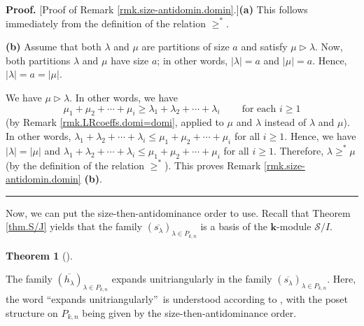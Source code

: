 \documentclass[numbers=enddot,12pt,final,onecolumn,notitlepage]{scrartcl}%
\theoremstyle{definition}
\newtheorem{theo}{Theorem}[section]
\newenvironment{theorem}[1][]
{\begin{theo}[#1]\begin{leftbar}}
{\end{leftbar}\end{theo}}
\newenvironment{proof}[1][Proof]{\noindent\textbf{#1.} }{\ \rule{0.5em}{0.5em}}
\begin{document}
\begin{proof}
[Proof of Remark \ref{rmk.size-antidomin.domin}.]\textbf{(a)} This follows
immediately from the definition of the relation $\geq^{\ast}$.

\textbf{(b)} Assume that both $\lambda$ and $\mu$ are partitions of size $a$
and satisfy $\mu\triangleright\lambda$. Now, both partitions $\lambda$ and
$\mu$ have size $a$; in other words, $\left\vert \lambda\right\vert =a$ and
$\left\vert \mu\right\vert =a$. Hence, $\left\vert \lambda\right\vert
=a=\left\vert \mu\right\vert $.

We have $\mu\triangleright\lambda$. In other words, we have
\[
\mu_{1}+\mu_{2}+\cdots+\mu_{i}\geq\lambda_{1}+\lambda_{2}+\cdots+\lambda
_{i}\ \ \ \ \ \ \ \ \ \ \text{for each }i\geq1
\]
(by Remark \ref{rmk.LRcoeffs.domi=domi}, applied to $\mu$ and $\lambda$
instead of $\lambda$ and $\mu$). In other words, $\lambda_{1}+\lambda
_{2}+\cdots+\lambda_{i}\leq\mu_{1}+\mu_{2}+\cdots+\mu_{i}$ for all $i\geq1$.
Hence, we have $\left\vert \lambda\right\vert =\left\vert \mu\right\vert $ and
$\lambda_{1}+\lambda_{2}+\cdots+\lambda_{i}\leq\mu_{1}+\mu_{2}+\cdots+\mu_{i}$
for all $i\geq1$. Therefore, $\lambda\geq^{\ast}\mu$ (by the definition of the
relation $\geq^{\ast}$). This proves Remark \ref{rmk.size-antidomin.domin}
\textbf{(b)}.
\end{proof}

Now, we can put the size-then-antidominance order to use. Recall that Theorem
\ref{thm.S/J} yields that the family $\left(  \overline{s_{\lambda}}\right)
_{\lambda\in P_{k,n}}$ is a basis of the $\mathbf{k}$-module $\mathcal{S}/I$.

\begin{theorem}
\label{thm.s-h-triangularity}The family $\left(  \overline{h_{\lambda}%
}\right)  _{\lambda\in P_{k,n}}$ expands unitriangularly in the family
$\left(  \overline{s_{\lambda}}\right)  _{\lambda\in P_{k,n}}$. Here, the word
\textquotedblleft expands unitriangularly\textquotedblright\ is understood
according to \cite[Definition 11.1.16(c)]{GriRei18}, with the poset structure
on $P_{k,n}$ being given by the size-then-antidominance order.
\end{theorem}
\end{document}
